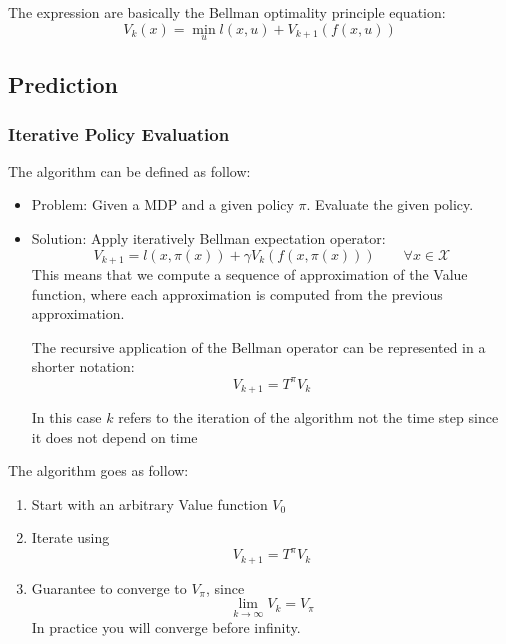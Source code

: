The expression are basically the Bellman optimality principle equation:
\[V_k(x) = \min_{u} l(x,u) + V_{k+1}(f(x,u))\]

\subsection{Prediction}
\subsubsection{Iterative Policy Evaluation}
The  algorithm can be defined as follow:
\begin{itemize}
\item Problem: Given a MDP and a given policy $\pi$. Evaluate the given policy.
\item Solution: Apply iteratively Bellman expectation operator:
\[V_{k+1} = l(x,\pi(x)) + \gamma V_{k}(f(x,\pi(x)))\qquad \forall x \in \mathcal{X}\]
This means that we compute a sequence of approximation of the Value function, where each approximation is computed from the previous approximation.

The recursive application of the Bellman operator can be represented in a shorter notation:
\[V_{k+1} = T^{\pi}V_k\]

In this case $k$ refers to the iteration of the algorithm not the time step since it does not depend on time
\end{itemize}

The algorithm goes as follow:
\begin{enumerate}
\item Start with an arbitrary Value function $V_0$
\item Iterate using
\[V_{k+1} = T^{\pi}V_k\]
\item Guarantee to converge to $V_{\pi}$, since
\[\lim_{k\to\infty} V_k = V_{\pi}\]
In practice you will converge before infinity.
\end{enumerate}

